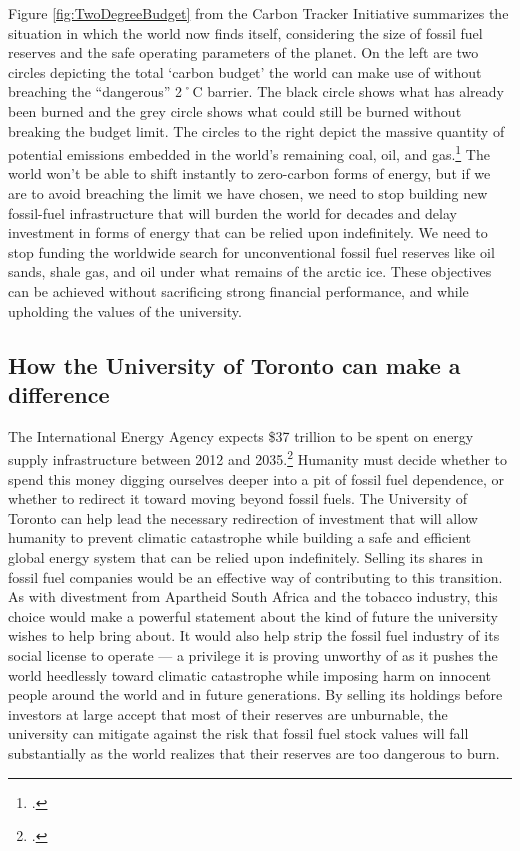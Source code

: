 Figure \ref{fig:TwoDegreeBudget} from the Carbon Tracker Initiative summarizes the situation in which the world now finds itself, considering the size of fossil fuel reserves and the safe operating parameters of the planet.
On the left are two circles depicting the total `carbon budget' the world can make use of without breaching the ``dangerous'' 2˚C barrier.
The black circle shows what has already been burned and the grey circle shows what could still be burned without breaking the budget limit.
The circles to the right depict the massive quantity of potential  emissions embedded in the world's remaining coal, oil, and gas.\footcite[][p. 6]{CTI2012}
The world won't be able to shift instantly to zero-carbon forms of energy, but if we are to avoid breaching the limit we have chosen, we need to stop building new fossil-fuel infrastructure that will burden the world for decades and delay investment in forms of energy that can be relied upon indefinitely.
We need to stop funding the worldwide search for unconventional fossil fuel reserves like oil sands, shale gas, and oil under what remains of the arctic ice.
These objectives can be achieved without sacrificing strong financial performance, and while upholding the values of the university. 




\subsection{How the University of Toronto can make a difference}



The International Energy Agency expects \$37 trillion to be spent on energy supply infrastructure between 2012 and 2035.\footcite[][]{IEA2012factsheet}
Humanity must decide whether to spend this money digging ourselves deeper into a pit of fossil fuel dependence, or whether to redirect it toward moving beyond fossil fuels.
The University of Toronto can help lead the necessary redirection of investment that will allow humanity to prevent climatic catastrophe while building a safe and efficient global energy system that can be relied upon indefinitely.
Selling its shares in fossil fuel companies would be an effective way of contributing to this transition.
As with divestment from Apartheid South Africa and the tobacco industry, this choice would make a powerful statement about the kind of future the university wishes to help bring about.
It would also help strip the fossil fuel industry of its social license to operate --- a privilege it is proving unworthy of as it pushes the world heedlessly toward climatic catastrophe while imposing harm on innocent people around the world and in future generations.
By selling its holdings before investors at large accept that most of their reserves are unburnable, the university can mitigate against the risk that fossil fuel stock values will fall substantially as the world realizes that their reserves are too dangerous to burn.



